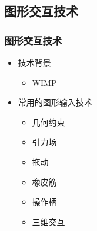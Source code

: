 \documentclass{beamer}
\begin{document}

\subsection{图形交互技术}
\begin{frame}
	\frametitle{图形交互技术}
	\beamertemplatetransparentcovereddynamicmedium
	\begin{itemize}
		\item 技术背景
		\begin{itemize}
			\item WIMP
		\end{itemize}
		\pause
		\item 常用的图形输入技术
		\begin{itemize}
			\item 几何约束
			\item 引力场
			\item 拖动
			\item 橡皮筋
			\item 操作柄
			\item 三维交互
		\end{itemize}
	\end{itemize}\pause
\end{frame}
\end{document}
